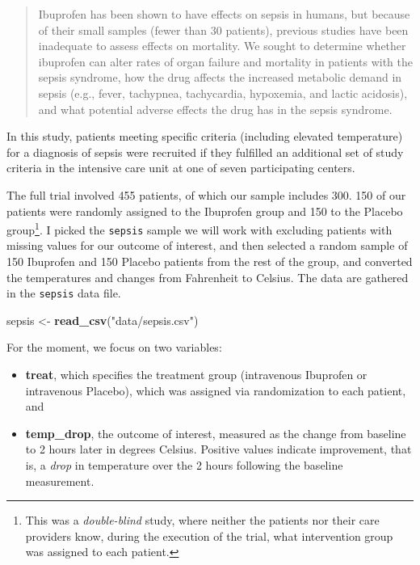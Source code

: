 \documentclass[
]{book}
\newenvironment{Shaded}{\begin{snugshade}}{\end{snugshade}}
\newcommand{\KeywordTok}[1]{\textcolor[rgb]{0.13,0.29,0.53}{\textbf{#1}}}
\newcommand{\NormalTok}[1]{#1}
\newcommand{\StringTok}[1]{\textcolor[rgb]{0.31,0.60,0.02}{#1}}
\providecommand{\tightlist}{%
  \setlength{\itemsep}{0pt}\setlength{\parskip}{0pt}}
\begin{document}
\begin{quote}
Ibuprofen has been shown to have effects on sepsis in humans, but because of their small samples (fewer than 30 patients), previous studies have been inadequate to assess effects on mortality. We sought to determine whether ibuprofen can alter rates of organ failure and mortality in patients with the sepsis syndrome, how the drug affects the increased metabolic demand in sepsis (e.g., fever, tachypnea, tachycardia, hypoxemia, and lactic acidosis), and what potential adverse effects the drug has in the sepsis syndrome.
\end{quote}

In this study, patients meeting specific criteria (including elevated temperature) for a diagnosis of sepsis were recruited if they fulfilled an additional set of study criteria in the intensive care unit at one of seven participating centers.

The full trial involved 455 patients, of which our sample includes 300. 150 of our patients were randomly assigned to the Ibuprofen group and 150 to the Placebo group\footnote{This was a \emph{double-blind} study, where neither the patients nor their care providers know, during the execution of the trial, what intervention group was assigned to each patient.}. I picked the \texttt{sepsis} sample we will work with excluding patients with missing values for our outcome of interest, and then selected a random sample of 150 Ibuprofen and 150 Placebo patients from the rest of the group, and converted the temperatures and changes from Fahrenheit to Celsius. The data are gathered in the \texttt{sepsis} data file.

\begin{Shaded}
\begin{Highlighting}[]
\NormalTok{sepsis <-}\StringTok{ }\KeywordTok{read_csv}\NormalTok{(}\StringTok{"data/sepsis.csv"}\NormalTok{)}
\end{Highlighting}
\end{Shaded}

For the moment, we focus on two variables:

\begin{itemize}
\tightlist
\item
  \textbf{treat}, which specifies the treatment group (intravenous Ibuprofen or intravenous Placebo), which was assigned via randomization to each patient, and
\item
  \textbf{temp\_drop}, the outcome of interest, measured as the change from baseline to 2 hours later in degrees Celsius. Positive values indicate improvement, that is, a \emph{drop} in temperature over the 2 hours following the baseline measurement.
\end{itemize}
\end{document}
